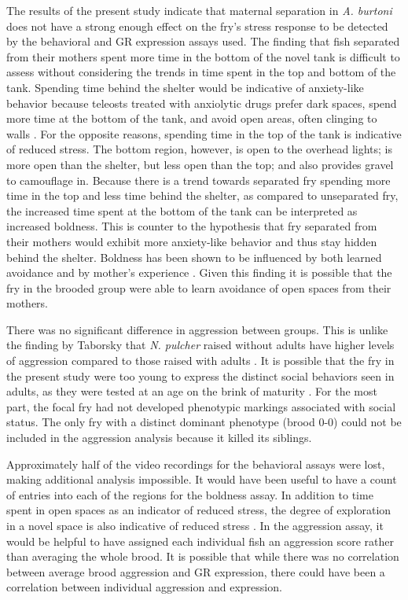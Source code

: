 \documentclass[12pt,twoside]{reedthesis}
\begin{document}
The results of the present study indicate that maternal separation in \textit{A.
burtoni} does not have a strong enough effect on the fry's stress response to be
detected by the behavioral and GR expression assays used. The finding that fish separated from their mothers spent more time in the bottom of the novel
tank is difficult to assess without considering the trends in time spent in the
top and bottom of the tank. Spending time behind the shelter would be
indicative of anxiety-like behavior because teleosts treated with anxiolytic
drugs prefer dark spaces, spend more time at the bottom of the tank, and avoid
open areas, often clinging to walls \citep{Gould2011, neumeister_socially_2017,
  ansai_chronic_2016, norton_three-spined_2019, ghisleni_role_2012}. For the opposite reasons, spending time in the top of the
tank is indicative of reduced stress. The bottom region, however, is open to the
overhead lights; is more open than the shelter, but less open than the top; and also provides gravel to
camouflage in. Because there is a trend towards separated fry spending more time in the top
and less time behind the shelter, as compared to unseparated fry, the increased
time spent at the bottom of the tank can be interpreted as increased 
boldness. This is counter to the hypothesis that
fry separated from their mothers would exhibit more anxiety-like behavior and
thus stay hidden behind the shelter. Boldness has been shown to be influenced by
both learned avoidance and by mother's experience \citep{brown_heritable_2007}.
Given this finding it is possible that the fry in
the brooded group were able to learn avoidance of open spaces from their mothers. 

There was no significant difference in aggression between groups. This is unlike the
finding by Taborsky that \textit{N. pulcher} raised without adults have higher levels of
aggression compared to those raised with adults \citep{arnold_social_2010}. It
is possible that the fry in the present study were too young to express the
distinct social behaviors seen in adults, as they were tested at an age on the
brink of maturity \citep{fernald_quantitative_1977}. For the most part, the focal fry had not developed
phenotypic markings associated with social status. The only fry with a distinct
dominant phenotype (brood 0-0) could not be included in
the aggression analysis because it killed its siblings.

Approximately half of the video recordings for the behavioral assays
were lost, making additional analysis impossible. It would have been useful to
have a count of entries into each of the regions for the boldness assay. In
addition to time spent in open spaces as an indicator of reduced
stress, the degree of exploration in a novel space is also indicative of
reduced stress \citep{bannier_early_2017}. In the aggression assay, it would be helpful to have assigned
each individual fish an aggression score rather than averaging the whole brood.
It is possible that while there was no correlation between average brood
aggression and GR expression, there could have been a correlation between
individual aggression and expression. 
\end{document}
